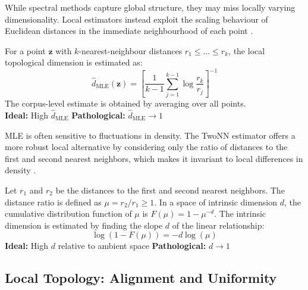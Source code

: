 While spectral methods capture global structure, they may miss locally varying dimensionality. Local estimators instead exploit the scaling behaviour of Euclidean distances in the immediate neighbourhood of each point \cite{Levina2004_MLE}.

\begin{metricbox}
For a point $\mathbf{z}$ with $k$-nearest-neighbour distances $r_1 \leq \dots \leq r_k$, the local topological dimension is estimated as:
\begin{equation}
    \hat{d}_{\mathrm{MLE}}(\mathbf{z}) = \left[ \frac{1}{k-1}\sum_{j=1}^{k-1} \log\frac{r_k}{r_j} \right]^{-1}
    \label{met:MLE}
\end{equation}
The corpus-level estimate is obtained by averaging over all points. \\
\textbf{Ideal:} High $\hat{d}_{\mathrm{MLE}}$ \quad \textbf{Pathological:} $\hat{d}_{\mathrm{MLE}} \to 1$
\end{metricbox}

MLE is often sensitive to fluctuations in density. The \ac{TwoNN} estimator offers a more robust local alternative by considering only the ratio of distances to the first and second nearest neighbors, which makes it invariant to local differences in density \cite{facco_estimating_2017}.

\begin{metricbox}
Let $r_1$ and $r_2$ be the distances to the first and second nearest neighbors. The distance ratio is defined as $\mu = r_2 / r_1 \geq 1$. In a space of intrinsic dimension $d$, the cumulative distribution function of $\mu$ is $F(\mu) = 1 - \mu^{-d}$. The intrinsic dimension is estimated by finding the slope $d$ of the linear relationship:
\begin{equation}
    \log(1 - F(\mu)) = -d \log(\mu)
    \label{met:twonn}
\end{equation}
\textbf{Ideal:} High $d$ relative to ambient space \quad \textbf{Pathological:} $d \to 1$
\end{metricbox}


\subsection{Local Topology: Alignment and Uniformity}
\label{sec:alignment_uniformity}

